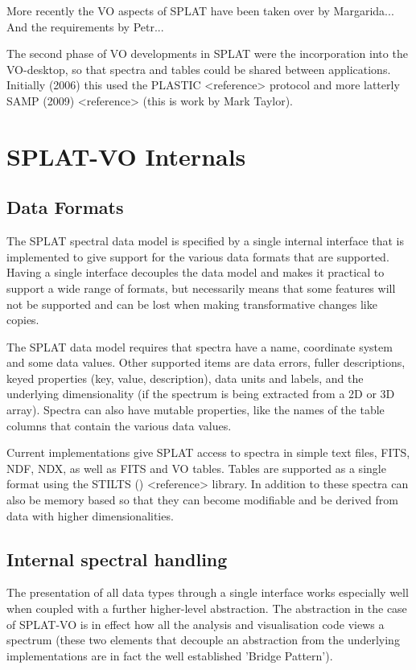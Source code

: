 \documentclass[final,authoryear,5p,times,twocolumn]{elsarticle}
\begin{document}
More recently the VO aspects of SPLAT have been taken over by Margarida...
And the requirements by Petr...

The second phase of VO developments in SPLAT were the incorporation into the
VO-desktop, so that spectra and tables could be shared between applications.
Initially (2006) this used the PLASTIC <reference> protocol and more latterly
SAMP (2009) <reference> (this is work by Mark Taylor).

\section{SPLAT-VO Internals}

\subsection{Data Formats}

The SPLAT spectral data model is specified by a single internal interface that
is implemented to give support for the various data formats that are
supported. Having a single interface decouples the data model and makes it
practical to support a wide range of formats, but necessarily means that some
features will not be supported and can be lost when making transformative
changes like copies.

The SPLAT data model requires that spectra have a name, coordinate system and
some data values. Other supported items are data errors, fuller descriptions,
keyed properties (key, value, description), data units and labels, and the
underlying dimensionality (if the spectrum is being extracted from a 2D or 3D
array). Spectra can also have mutable properties, like the names of the table
columns that contain the various data values.

Current implementations give SPLAT access to spectra in simple text files,
FITS, NDF, NDX, as well as FITS and VO tables. Tables are supported as a
single format using the STILTS () <reference> library. In addition to these
spectra can also be memory based so that they can become modifiable and be
derived from data with higher dimensionalities.

\subsection{Internal spectral handling}

The presentation of all data types through a single interface works especially
well when coupled with a further higher-level abstraction. The abstraction in
the case of SPLAT-VO is in effect how all the analysis and visualisation code
views a spectrum (these two elements that decouple an abstraction from the
underlying implementations are in fact the well established 'Bridge Pattern').
\end{document}
